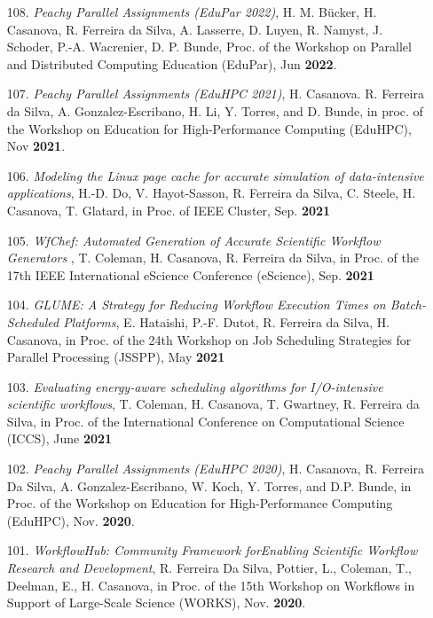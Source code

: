 \begin{enumerate}
\item [108.] {\it Peachy Parallel Assignments (EduPar 2022)}, 
H. M. B\"ucker, H. Casanova, R. Ferreira da Silva, A. Lasserre, D. Luyen, R. Namyst, J. Schoder, P.-A. Wacrenier, D. P. Bunde, Proc. of the Workshop on Parallel and Distributed Computing Education (EduPar), Jun {\bf 2022}.

\item [107.] {\it Peachy Parallel Assignments (EduHPC 2021)}, H.  Casanova.
R. Ferreira da Silva, A. Gonzalez-Escribano, H. Li, Y. Torres, and D.
Bunde, in proc. of the Workshop on Education for High-Performance Computing
(EduHPC), Nov {\bf 2021}.


    \item [106.] {\it Modeling the Linux page cache for accurate simulation of data-intensive applications}, H.-D. Do, V. Hayot-Sasson, R. Ferreira da Silva, C. Steele, H. Casanova, T. Glatard, in Proc. of IEEE Cluster, Sep. {\bf 2021}

    \item [105.] {\it WfChef: Automated Generation of Accurate Scientific Workflow Generators
}, T. Coleman, H. Casanova, R. Ferreira da Silva, in Proc. of the 17th IEEE International eScience Conference (eScience), Sep. {\bf 2021}

    \item [104.] {\it GLUME: A Strategy for Reducing Workflow Execution Times on Batch-Scheduled Platforms}, E. Hataishi, P.-F. Dutot, R. Ferreira da Silva, H. Casanova, in Proc. of the 24th Workshop on Job Scheduling Strategies for Parallel Processing (JSSPP), May {\bf 2021}

    \item [103.] {\it Evaluating energy-aware scheduling algorithms for
    I/O-intensive scientific workflows}, T. Coleman, H. Casanova, T.
    Gwartney, R. Ferreira da Silva,
	in Proc. of the International Conference on Computational Science
	(ICCS), June {\bf 2021}


    \item [102.] {\it Peachy Parallel Assignments (EduHPC 2020)},
H. Casanova, R. Ferreira Da Silva, A. Gonzalez-Escribano, W. Koch, Y.
Torres, and D.P. Bunde, in Proc. of the Workshop on Education for
High-Performance Computing (EduHPC), Nov. {\bf 2020}.

\item [101.] {\it WorkflowHub: Community Framework forEnabling
Scientific Workflow Research and Development},
R. Ferreira Da Silva, Pottier, L., Coleman, T., Deelman, E., H. Casanova,
in Proc. of the 15th Workshop on Workflows in Support of
Large-Scale Science (WORKS), Nov. {\bf 2020}.


\end{enumerate}
